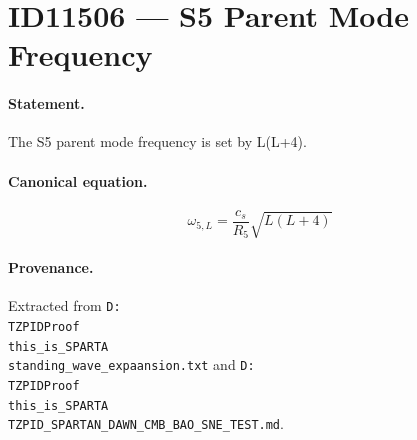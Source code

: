 \section*{ID11506 --- S5 Parent Mode Frequency}

\paragraph{Statement.}
The S5 parent mode frequency is set by L(L+4).

\paragraph{Canonical equation.}
\[
\omega_{5,L}=\frac{c_s}{R_5}\sqrt{L(L+4)}
\]

\paragraph{Provenance.}
Extracted from \texttt{D:\\TZPIDProof\\this\_is\_SPARTA\\standing\_wave\_expaansion.txt} and \texttt{D:\\TZPIDProof\\this\_is\_SPARTA\\TZPID\_SPARTAN\_DAWN\_CMB\_BAO\_SNE\_TEST.md}.
